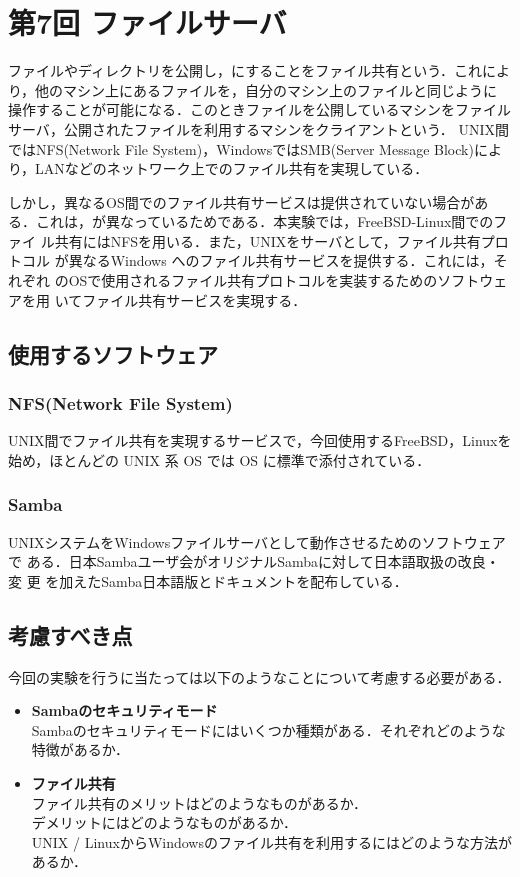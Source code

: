 \section{第7回 ファイルサーバ}
ファイルやディレクトリを公開し，\textbf{}にすることをファイル共有という．これによ
り，他のマシン上にあるファイルを，自分のマシン上のファイルと同じように
操作することが可能になる．このときファイルを公開しているマシンをファイル
サーバ，公開されたファイルを利用するマシンをクライアントという．  UNIX間
ではNFS(Network File System)，WindowsではSMB(Server Message Block)によ
り，LANなどのネットワーク上でのファイル共有を実現している．

しかし，異なるOS間でのファイル共有サービスは提供されていない場合があ
る．これは，\textbf{}が異なっているためである．本実験では，FreeBSD-Linux間でのファイ
ル共有にはNFSを用いる．また，UNIXをサーバとして，ファイル共有プロトコル
が異なるWindows へのファイル共有サービスを提供する．これには，それぞれ
のOSで使用されるファイル共有プロトコルを実装するためのソフトウェアを用
いてファイル共有サービスを実現する．

\vspace{-1zh}
\subsection*{使用するソフトウェア}
\subsubsection*{NFS(Network File System)}
UNIX間でファイル共有を実現するサービスで，今回使用するFreeBSD，Linuxを
始め，ほとんどの UNIX 系 OS では OS に標準で添付されている．
\subsubsection*{Samba}
UNIXシステムをWindowsファイルサーバとして動作させるためのソフトウェアで
ある．日本Sambaユーザ会がオリジナルSambaに対して日本語取扱の改良・変
更 を加えたSamba日本語版とドキュメントを配布している．

\vspace{-1zh}
\subsection*{考慮すべき点}
今回の実験を行うに当たっては以下のようなことについて考慮する必要がある．
\begin{itemize}
  \item \textbf{Sambaのセキュリティモード}\\
Sambaのセキュリティモードにはいくつか種類がある．それぞれどのような特徴があるか．
\item \textbf{ファイル共有}\\
ファイル共有のメリットはどのようなものがあるか．\\
デメリットにはどのようなものがあるか．\\
UNIX / LinuxからWindowsのファイル共有を利用するにはどのような方法があるか．
\end{itemize}
